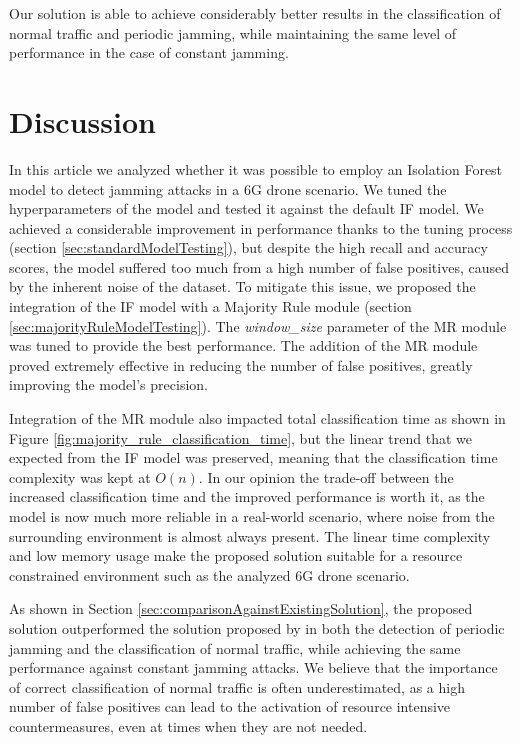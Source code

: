 \documentclass[futureinternet,article,submit,pdftex,moreauthors]{Definitions/mdpi}
\begin{document}
Our solution is able to achieve considerably better results in the classification of normal traffic and periodic jamming, while maintaining the same level of performance in the case of constant jamming.

\section{Discussion}


In this article we analyzed whether it was possible to employ an Isolation Forest model to detect jamming attacks in a 6G drone scenario. We tuned the hyperparameters of the model and tested it against the default IF model. 
We achieved a considerable improvement in performance thanks to the tuning process (section \ref{sec:standardModelTesting}), but despite the high recall and accuracy scores, the model suffered too much from a high number of false positives, caused by the inherent noise of the dataset. 
To mitigate this issue, we proposed the integration of the IF model with a Majority Rule module (section \ref{sec:majorityRuleModelTesting}). The \textit{window\_size} parameter of the MR module was tuned to provide the best performance.
The addition of the MR module proved extremely effective in reducing the number of false positives, greatly improving the model's precision. 

Integration of the MR module also impacted total classification time as shown in Figure \ref{fig:majority_rule_classification_time}, but the linear trend \cite{IsolationForestLiu} that we expected from the IF model was preserved, meaning that the classification time complexity was kept at $O(n)$. 
In our opinion the trade-off between the increased classification time and the improved performance is worth it, as the model is now much more reliable in a real-world scenario, where noise from the surrounding environment is almost always present.
The linear time complexity and low memory usage make the proposed solution suitable for a resource constrained environment such as the analyzed 6G drone scenario.

As shown in Section \ref{sec:comparisonAgainstExistingSolution}, the proposed solution outperformed the solution proposed by \cite{JammingDetectionIoT-Hussain} in both the detection of periodic jamming and the classification of normal traffic, while achieving the same performance against constant jamming attacks. 
We believe that the importance of correct classification of normal traffic is often underestimated, as a high number of false positives can lead to the activation of resource intensive countermeasures, even at times when they are not needed. 
\end{document}

